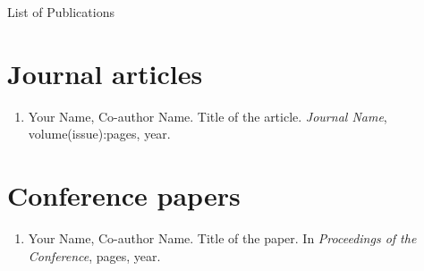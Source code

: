 \begin{frontchapter}{List of Publications}
\section*{Journal articles}
\begin{enumerate}
  \item Your Name, Co-author Name. Title of the article. \emph{Journal Name}, volume(issue):pages, year.
\end{enumerate}
\section*{Conference papers}
\begin{enumerate}
  \item Your Name, Co-author Name. Title of the paper. In \emph{Proceedings of the Conference}, pages, year.
\end{enumerate}
\end{frontchapter}
